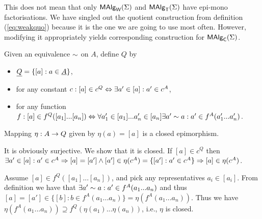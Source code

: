 \documentclass[10pt]{article}
\begin{document}
\noindent
This does not mean that only $\mbox{\rm\sf MAlg}_{\sf W}(\Sigma)$ and $\mbox{\rm\sf MAlg}_{\sf T}(\Sigma)$ have epi-mono
factorisations. We have singled out the quotient construction from
definition (\ref{eq:weakquo}) because it is the one we are going to
use most often. However, modifying it appropriately yields
corresponding construction for $\mbox{\rm\sf MAlg}_{\sf C}(\Sigma)$.
% 
\begin{Fact}\label{fa:closed}
Given an equivalence $\sim$ on $A$, define $Q$ 
by 
\begin{itemize}\MyLPar
\item $\underline {Q}=\{[a]:a\in\underline {A}\}$, 
\item for any constant $c:[a]\in c^Q \Leftrightarrow \exists a'\in[a]:a'\in c^A$,
\item for any function $f: [a]\in f^Q([a_1]...[a_n]) \Leftrightarrow
 \forall a'_1\in[a_1]...a'_n\in[a_n] \exists a'\sim a:
  a'\in   f^A(a'_1...a'_n)$.
\end{itemize}
Mapping $\eta:A\rightarrow Q$ given by $\eta(a)=[a]$ is a closed epimorphism.
\end{Fact}

\begin{Proof}
It is obviously surjective. We show that it is closed.
If $[a]\in c^Q$ then\\  $\exists a'\in[a]:a'\in c^A\Rightarrow [a]=[a']\land
 [a']\in\eta(c^A)=\{[a']:a'\in c^A\}\Rightarrow [a]\in\eta(c^A)$.

Assume $[a]\in f^Q([a_1]...[a_n])$, and pick any representatives
$a_i\in[a_i]$. From definition we have that $\exists a'\sim a:
a'\in f^A(a_1...a_n)$ and thus $[a]=[a']\in\{[b]:b\in f^A(a_1...a_n)\}
= \eta(f^A(a_1...a_n))$. Thus we have 
$\eta(f^A(a_1...a_n))\supseteq f^Q(\eta(a_1)...\eta(a_n))$, i.e.,
$\eta$ is closed.
\end{Proof}
\end{document}
